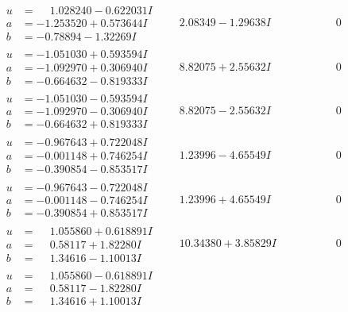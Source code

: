 \documentclass[1p]{elsarticle_modified}
\theoremstyle{definition}
\begin{document}
$$\begin{array}{c|c|c}
\begin{aligned}
u &= \phantom{-}1.028240 - 0.622031 I \\
a &= -1.253520 + 0.573644 I \\
b &= -0.78894 - 1.32269 I\end{aligned}
 & \phantom{-}2.08349 - 1.29638 I & \phantom{-0.000000 } 0 \\ \hline\begin{aligned}
u &= -1.051030 + 0.593594 I \\
a &= -1.092970 + 0.306940 I \\
b &= -0.664632 - 0.819333 I\end{aligned}
 & \phantom{-}8.82075 + 2.55632 I & \phantom{-0.000000 } 0 \\ \hline\begin{aligned}
u &= -1.051030 - 0.593594 I \\
a &= -1.092970 - 0.306940 I \\
b &= -0.664632 + 0.819333 I\end{aligned}
 & \phantom{-}8.82075 - 2.55632 I & \phantom{-0.000000 } 0 \\ \hline\begin{aligned}
u &= -0.967643 + 0.722048 I \\
a &= -0.001148 + 0.746254 I \\
b &= -0.390854 - 0.853517 I\end{aligned}
 & \phantom{-}1.23996 - 4.65549 I & \phantom{-0.000000 } 0 \\ \hline\begin{aligned}
u &= -0.967643 - 0.722048 I \\
a &= -0.001148 - 0.746254 I \\
b &= -0.390854 + 0.853517 I\end{aligned}
 & \phantom{-}1.23996 + 4.65549 I & \phantom{-0.000000 } 0 \\ \hline\begin{aligned}
u &= \phantom{-}1.055860 + 0.618891 I \\
a &= \phantom{-}0.58117 + 1.82280 I \\
b &= \phantom{-}1.34616 - 1.10013 I\end{aligned}
 & \phantom{-}10.34380 + 3.85829 I & \phantom{-0.000000 } 0 \\ \hline\begin{aligned}
u &= \phantom{-}1.055860 - 0.618891 I \\
a &= \phantom{-}0.58117 - 1.82280 I \\
b &= \phantom{-}1.34616 + 1.10013 I\end{aligned}

\end{array}$$
\end{document}
